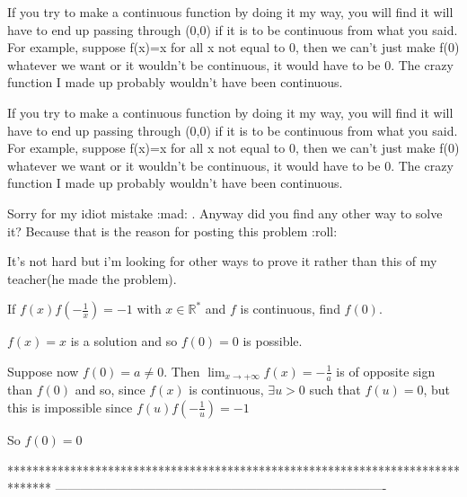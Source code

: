 \begin{solution}
	If you try to make a continuous function by doing it my way, you will find it will have to end up passing through (0,0) if it is to be continuous from what you said. For example, suppose f(x)=x for all x not equal to 0, then we can't just make f(0) whatever we want or it wouldn't be continuous, it would have to be 0.
The crazy function I made up probably wouldn't have been continuous.
\end{solution}



\begin{solution}
	\begin{tcolorbox}If you try to make a continuous function by doing it my way, you will find it will have to end up passing through (0,0) if it is to be continuous from what you said. For example, suppose f(x)=x for all x not equal to 0, then we can't just make f(0) whatever we want or it wouldn't be continuous, it would have to be 0.
The crazy function I made up probably wouldn't have been continuous.\end{tcolorbox}

Sorry for my idiot mistake :mad: . Anyway did you find any other way to solve it? Because that is the reason for posting this problem :roll:
\end{solution}



\begin{solution}
	\begin{tcolorbox}It's not hard but i'm looking for other ways to prove it rather than this of my teacher(he made the problem). 

If $ f(x)f\left( - \frac {1}{x}\right) = - 1$ with $ x\in \mathbb{R^*}$ and $ f$ is continuous, find $ f(0)$.\end{tcolorbox}
$ f(x)=x$ is a solution and so $ f(0)=0$ is possible.

Suppose now $ f(0)=a\neq 0$. Then $ \lim_{x\to +\infty}f(x)=-\frac 1a$ is of opposite sign than $ f(0)$ and so, since $ f(x)$ is continuous, $ \exists u>0$ such that $ f(u)=0$, but this is impossible since $ f(u)f(-\frac 1u)=-1$

So $ f(0)=0$
\end{solution}
*******************************************************************************
-------------------------------------------------------------------------------

